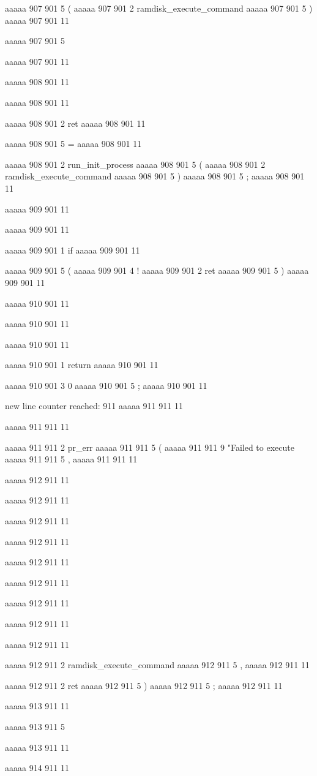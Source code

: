 {aaaaa 907 901
5
(
aaaaa 907 901
2
ramdisk_execute_command
aaaaa 907 901
5
)
aaaaa 907 901
11
 
aaaaa 907 901
5
{
aaaaa 907 901
11


aaaaa 908 901
11
	
aaaaa 908 901
11
	
aaaaa 908 901
2
ret
aaaaa 908 901
11
 
aaaaa 908 901
5
=
aaaaa 908 901
11
 
aaaaa 908 901
2
run_init_process
aaaaa 908 901
5
(
aaaaa 908 901
2
ramdisk_execute_command
aaaaa 908 901
5
)
aaaaa 908 901
5
;
aaaaa 908 901
11


aaaaa 909 901
11
	
aaaaa 909 901
11
	
aaaaa 909 901
1
if
aaaaa 909 901
11
 
aaaaa 909 901
5
(
aaaaa 909 901
4
!
aaaaa 909 901
2
ret
aaaaa 909 901
5
)
aaaaa 909 901
11


aaaaa 910 901
11
	
aaaaa 910 901
11
	
aaaaa 910 901
11
	
aaaaa 910 901
1
return
aaaaa 910 901
11
 
aaaaa 910 901
3
0
aaaaa 910 901
5
;
aaaaa 910 901
11


new line counter reached: 911
aaaaa 911 911
11
	
aaaaa 911 911
11
	
aaaaa 911 911
2
pr_err
aaaaa 911 911
5
(
aaaaa 911 911
9
"Failed to execute %
aaaaa 911 911
5
,
aaaaa 911 911
11


aaaaa 912 911
11
	
aaaaa 912 911
11
	
aaaaa 912 911
11
 
aaaaa 912 911
11
 
aaaaa 912 911
11
 
aaaaa 912 911
11
 
aaaaa 912 911
11
 
aaaaa 912 911
11
 
aaaaa 912 911
11
 
aaaaa 912 911
2
ramdisk_execute_command
aaaaa 912 911
5
,
aaaaa 912 911
11
 
aaaaa 912 911
2
ret
aaaaa 912 911
5
)
aaaaa 912 911
5
;
aaaaa 912 911
11


aaaaa 913 911
11
	
aaaaa 913 911
5
}
aaaaa 913 911
11


aaaaa 914 911
11


}

